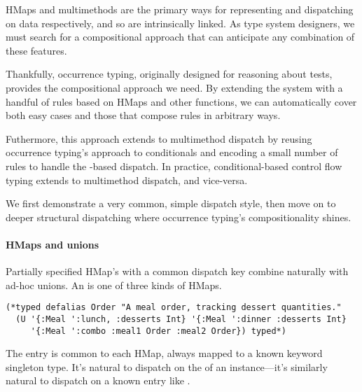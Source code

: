 HMaps and multimethods are the primary ways for representing
and dispatching on data respectively, and so are intrinsically linked.
As type system designers, we must
search for a compositional approach that can anticipate
any combination of these features.

Thankfully, occurrence typing, originally designed for reasoning about
 tests, provides the compositional approach we need.
By extending the system with
a handful of rules based on HMaps and other functions, 
we can automatically cover both easy cases and those
that compose rules in arbitrary ways.

Futhermore, this approach extends to multimethod dispatch by reusing
occurrence typing's approach to conditionals
and
encoding a small number of rules to handle
the -based dispatch.
In practice, conditional-based control flow typing
extends to multimethod dispatch, and vice-versa.

We first demonstrate a very common, simple dispatch style,
then move on to deeper structural dispatching where occurrence typing's
compositionality shines.

\paragraph{HMaps and unions} Partially specified HMap's with a common dispatch key
combine naturally with ad-hoc unions.
An  is one of three kinds of HMaps.


\begin{lstlisting}
(*typed defalias Order "A meal order, tracking dessert quantities."
  (U '{:Meal ':lunch, :desserts Int} '{:Meal ':dinner :desserts Int}
     '{:Meal ':combo :meal1 Order :meal2 Order}) typed*)
\end{lstlisting}

The  entry is common to each HMap, always mapped to a known keyword singleton
type.
It's natural to dispatch on the  of an instance---it's similarly
natural to dispatch on a known entry like .

\newpage

